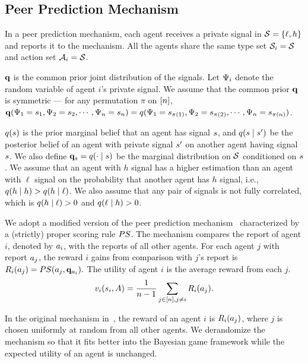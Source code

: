 \subsection{Peer Prediction Mechanism}
In a peer prediction mechanism, each agent receives a private signal in $\mathcal{S} = \{\ell, h\}$ and reports it to the mechanism. All the agents share the same type set $\mathcal{S}_i = \mathcal{S}$ and action set $\mathcal{A}_i = \mathcal{S}$. 

$\mathbf{q}$ is the common prior joint distribution of the signals. Let $\Psi_{i}$ denote the random variable of agent $i$'s private signal.
We assume that the common prior $\mathbf{q}$ is symmetric --- for any permutation $\pi$ on $[n]$, $\mathbf{q}(\Psi_1=s_1, \Psi_2 = s_2,\cdots, \Psi_n = s_n)=q(\Psi_1=s_{\pi(1)}, \Psi_2 = s_{\pi(2)},\cdots, \Psi_n = s_{\pi(n)})$. 

$q(s)$ is the prior marginal belief that an agent has signal $s$, and $q(s \mid s')$ be the posterior belief of an agent with private signal $s'$ on another agent having signal $s$. We also define $\mathbf{q}_{s} = q(\cdot \mid s)$ be the marginal distribution on $\mathcal{S}$ conditioned on $s$. We assume that an agent with $h$ signal has a higher estimation than an agent with $\ell$ signal on the probability that another agent has $h$ signal, i.e., $q(h\mid h) > q(h \mid \ell)$. We also assume that any pair of signals is not fully correlated, which is $q(h\mid \ell) > 0$ and $q(\ell \mid h) > 0$. 

We adopt a modified version of the peer prediction mechanism~\citep{Miller05:Eliciting} characterized by a (strictly) proper scoring rule $PS$. The mechanism compares the report of agent $i$, denoted by $a_i$, with the reports of all other agents. For each agent $j$ with report $a_j$, the reward $i$ gains from comparison with $j$'s report is $R_i(a_j) = PS(a_j, \mathbf{q}_{a_i}).$
The utility of agent $i$ is the average reward from each $j$.
\begin{equation*}
    v_i(s_i, A) = \frac{1}{n-1}\sum_{j\in[n], j\neq i} R_i(a_j). 
\end{equation*}
\begin{remark}
    In the original mechanism in~\citep{Miller05:Eliciting}, the reward of an agent $i$ is $R_i(a_j)$, where $j$ is chosen uniformly at random from all other agents. We derandomize the mechanism so that it fits better into the Bayesian game framework while the expected utility of an agent is unchanged. 
\end{remark}

